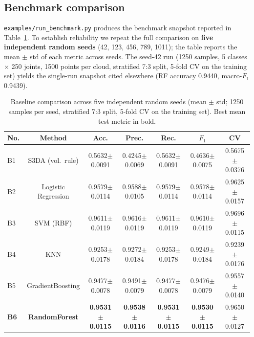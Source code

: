 \documentclass[3p]{elsarticle}
\begin{document}
\subsection{Benchmark comparison}
\texttt{examples/run\_benchmark.py} produces the benchmark snapshot reported in Table~\ref{tab:baseline}. To establish reliability we repeat the full comparison on \textbf{five independent random seeds} (42, 123, 456, 789, 1011); the table reports the mean $\pm$ std of each metric across seeds. The seed-42 run (1250 samples, 5 classes $\times$ 250 joints, 1500 points per cloud, stratified 7:3 split, 5-fold CV on the training set) yields the single-run snapshot cited elsewhere (RF accuracy 0.9440, macro-$F_1$ 0.9439).
\begin{table}[htbp]
\centering
\caption{Baseline comparison across five independent random seeds (mean $\pm$ std; 1250 samples per seed, stratified 7:3 split, 5-fold CV on the training set). Best mean test metric in bold.}
\label{tab:baseline}
{\small\setlength{\tabcolsep}{4pt}
\begin{tabular}{lcccccc}
\toprule
\textbf{No.} & \textbf{Method} & \textbf{Acc.} & \textbf{Prec.} & \textbf{Rec.} & \textbf{$F_1$} & \textbf{CV} \\
\midrule
B1 & S3DA (vol.\ rule) & 0.5632$\pm$0.0091 & 0.4245$\pm$0.0069 & 0.5632$\pm$0.0091 & 0.4636$\pm$0.0075 & 0.5675$\pm$0.0376 \\
B2 & Logistic Regression & 0.9579$\pm$0.0114 & 0.9588$\pm$0.0105 & 0.9579$\pm$0.0114 & 0.9578$\pm$0.0114 & 0.9625$\pm$0.0157 \\
B3 & SVM (RBF) & 0.9611$\pm$0.0119 & 0.9616$\pm$0.0119 & 0.9611$\pm$0.0119 & 0.9610$\pm$0.0119 & 0.9696$\pm$0.0115 \\
B4 & KNN & 0.9253$\pm$0.0178 & 0.9272$\pm$0.0184 & 0.9253$\pm$0.0178 & 0.9249$\pm$0.0184 & 0.9239$\pm$0.0176 \\
B5 & GradientBoosting & 0.9477$\pm$0.0078 & 0.9491$\pm$0.0079 & 0.9477$\pm$0.0078 & 0.9476$\pm$0.0079 & 0.9557$\pm$0.0140 \\
\textbf{B6} & \textbf{RandomForest} & \textbf{0.9531$\pm$0.0115} & \textbf{0.9538$\pm$0.0116} & \textbf{0.9531$\pm$0.0115} & \textbf{0.9530$\pm$0.0115} & 0.9650$\pm$0.0127 \\
\bottomrule
\end{tabular}
}
\end{table}
\end{document}
